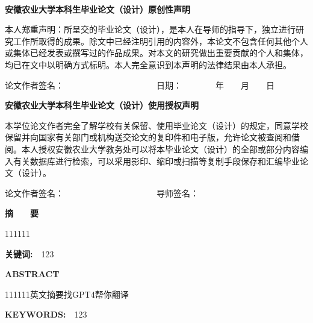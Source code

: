 \documentclass[UTF8,a4paper,12pt]{ctexart}
\begin{document}
	\thispagestyle{empty}
	\newpage　
	\vspace{1cm} \par \textbf{\fontsize{18pt}{\baselineskip}\heiti 安徽农业大学本科生毕业论文（设计）原创性声明}
	\vspace{1cm} \par 本人郑重声明：所呈交的毕业论文（设计），是本人在导师的指导下，独立进行研究工作所取得的成果。除文中已经注明引用的内容外，本论文不包含任何其他个人或集体已经发表或撰写过的作品成果。对本文的研究做出重要贡献的个人和集体，均已在文中以明确方式标明。本人完全意识到本声明的法律结果由本人承担。
	\vspace{1cm} \par 论文作者签名：　　　　　　　　　　　日期：　　　　年　　月　　日
	\vspace{6cm} \par \textbf{\fontsize{18pt}{\baselineskip}\heiti  安徽农业大学本科生毕业论文（设计）使用授权声明}
	\vspace{1cm} \par 本学位论文作者完全了解学校有关保留、使用毕业论文（设计）的规定，同意学校保留并向国家有关部门或机构送交论文的复印件和电子版，允许论文被查阅和借阅。本人授权安徽农业大学教务处可以将本毕业论文（设计）的全部或部分内容编入有关数据库进行检索，可以采用影印、缩印或扫描等复制手段保存和汇编毕业论文（设计）。
	\vspace{1cm} \par 论文作者签名：　　　　　　　　　　　导师签名：
	\thispagestyle{empty}
	
	\newpage
	\begin{spacing}{1.2}
	\tableofcontents
	\end{spacing}
	\thispagestyle{empty}
	
	\newpage
	 
	\centerline{\textbf{\fontsize{16pt}{\baselineskip}\heiti 摘　　要}}
	\vspace{0.4cm}
	111111
	\vspace{0.2cm}
	\par \textbf{\fontsize{14pt}{\baselineskip}\heiti 关键词:　}123
	\setcounter{page}{1}
	\newpage
	\centerline{\textbf{\fontsize{16pt}{\baselineskip}ABSTRACT}}
	\vspace{0.4cm}
	111111英文摘要找GPT4帮你翻译
	\vspace{0.4cm}
	\par \textbf{\fontsize{14pt}{\baselineskip}KEYWORDS:　}123
	\newpage
	\setcounter{page}{1}
\end{document}
